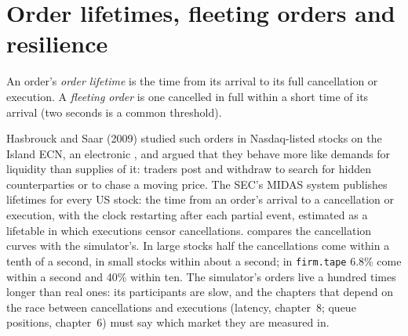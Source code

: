 \begin{omfigure}

\label{fig:mx:empirical-facts-of-order-books:intraday}
\end{omfigure}

\section{Order lifetimes, fleeting orders and resilience}

\begin{definition}\label{def:mx:empirical-facts-of-order-books:life}
An order's \emph{order lifetime} is the time from its arrival to its full cancellation or execution. A \emph{fleeting
order} is one cancelled in full within a short time of its arrival (two seconds is a common threshold).
\end{definition}

Hasbrouck and Saar (2009) studied such orders in Nasdaq-listed stocks on the Island ECN, an electronic , and argued that they behave more like demands for liquidity than supplies
of it: traders post and withdraw to search for hidden counterparties or to chase a moving price. The SEC's MIDAS system publishes lifetimes for every US
stock: the time from an order's arrival to a cancellation or execution, with the clock restarting after each partial event, estimated as a lifetable
in which executions censor cancellations.  compares the cancellation curves with the simulator's. In
large stocks half the cancellations come within a tenth of a second, in small stocks within about a second; in \texttt{firm.tape} 6.8\% come within a
second and 40\% within ten. The simulator's orders live a hundred times longer than real ones: its participants are slow, and the chapters that depend on
the race between cancellations and executions (latency, chapter~8; queue positions, chapter~6) must say which market they are measured in.

